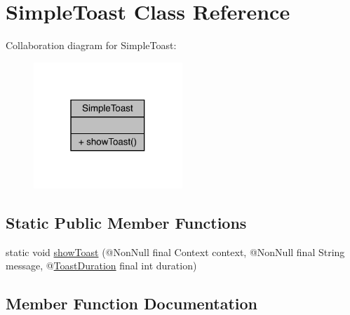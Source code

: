 \hypertarget{classcom_1_1toast_1_1android_1_1gamebase_1_1base_1_1ui_1_1_simple_toast}{}\section{Simple\+Toast Class Reference}
\label{classcom_1_1toast_1_1android_1_1gamebase_1_1base_1_1ui_1_1_simple_toast}


Collaboration diagram for Simple\+Toast\+:
\nopagebreak
\begin{figure}[H]
\begin{center}
\leavevmode
\includegraphics[width=159pt]{classcom_1_1toast_1_1android_1_1gamebase_1_1base_1_1ui_1_1_simple_toast__coll__graph}
\end{center}
\end{figure}
\subsection*{Static Public Member Functions}
\begin{DoxyCompactItemize}
\item 
static void \hyperlink{classcom_1_1toast_1_1android_1_1gamebase_1_1base_1_1ui_1_1_simple_toast_a8b9467dd0c63451fd09c70941c0ef736}{show\+Toast} (@Non\+Null final Context context, @Non\+Null final String message, @\hyperlink{interfacecom_1_1toast_1_1android_1_1gamebase_1_1base_1_1annotation_1_1_toast_duration}{Toast\+Duration} final int duration)
\end{DoxyCompactItemize}


\subsection{Member Function Documentation}
\mbox{\label{classcom_1_1toast_1_1android_1_1gamebase_1_1base_1_1ui_1_1_simple_toast_a8b9467dd0c63451fd09c70941c0ef736}} 
